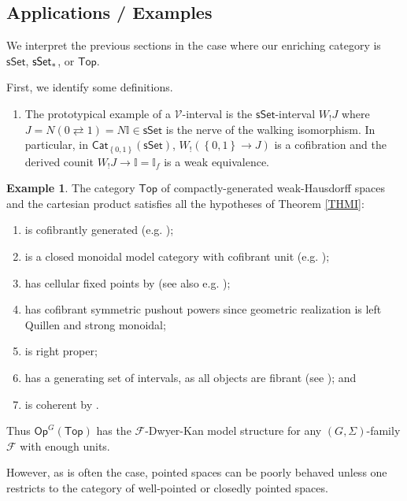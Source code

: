 \documentclass[a4paper,10pt
,draft
]{article}%
\numberwithin{equation}{section}
\numberwithin{figure}{section}
\theoremstyle{definition} %
\newtheorem{example}[equation]{Example}%
\newcommand{\set}[1]{\left\{#1\right\}}%
\newcommand{\Top}{\ensuremath{\mathsf{Top}}}
\newcommand{\sSet}{\ensuremath{\mathsf{sSet}}}%
\newcommand{\Cat}{\mathsf{Cat}}
\newcommand{\Op}{\mathsf{Op}}%
\newcommand{\F}{\ensuremath{\mathcal F}}
\newcommand{\V}{\ensuremath{\mathcal V}}
\newcommand{\I}{\mathbb I}
\newcommand{\1}{\ensuremath{\mathbbm 1}}%
\begin{document}
\newpage






\subsection{Applications / Examples}


We interpret the previous sections in the case where our enriching category is $\sSet$, $\sSet_{\**}$, or $\Top$.

First, we identify some definitions.
\begin{enumerate}[label = (\roman*)]
\item  The prototypical example of a $\V$-interval is the $\sSet$-interval $W_!J$ where $J = N(0 \rightleftarrows 1) = N \I \in \sSet$ is the nerve of the walking isomorphism.
      In particular, in $\Cat_{\set{0,1}}(\sSet)$,
      $W_!(\set{0,1} \to J)$ is a cofibration and
      the derived counit $W_!J \to \I = \I_f$ is a weak equivalence.
\end{enumerate}



\begin{example}
      The category $\Top$ of compactly-generated weak-Hausdorff spaces and the cartesian product satisfies all the hypotheses of Theorem \ref{THMI}:
      \begin{enumerate}[label = (\roman*)]\itemsep-4pt
      \item is cofibrantly generated (e.g. \cite{Pia91});
      \item is a closed monoidal model category with cofibrant unit (e.g. \cite[Prop. 4.2.11]{Hov99});
      \item has cellular fixed points by \cite{Pia91} (see also e.g. \cite[Lemma 3.18]{Ste16});
      \item has cofibrant symmetric pushout powers since geometric realization is left Quillen and strong monoidal;
      \item is right proper;
      \item has a generating set of intervals, as all objects are fibrant (see \cite[Lemma 2.1]{BM13}); and
      \item is coherent by \cite[Lem. 4.16]{BV73}.
      \end{enumerate}
      Thus
      $\Op^G(\Top)$ has the $\F$-Dwyer-Kan model structure for any $(G, \Sigma)$-family $\F$ with enough units.


      However, as is often the case, pointed spaces can be poorly behaved unless one restricts to the category of well-pointed or closedly pointed spaces. %
\end{example}
\end{document}
